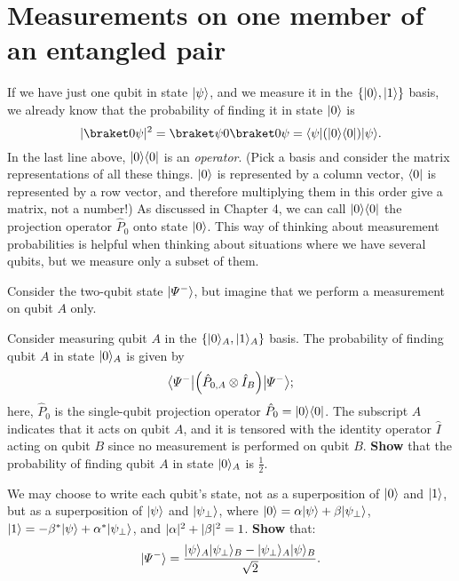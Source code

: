 \documentclass{../phys084}
\begin{document}
\begin{solution}
\end{solution}

\section{Measurements on one member of an entangled pair}

\begin{exercise}
  If we have just one qubit in state \(\lvert\psi\rangle\), and we measure it
  in the \(\{\lvert0\rangle, \lvert1\rangle\}\) basis, we already know that the
  probability of finding it in state \(\lvert0\rangle\) is
  \[
    \abs{\braket 0 \psi}^2
    = \braket \psi 0\braket 0 \psi
    = \bra \psi (\ket 0 \bra 0) \ket \psi.
  \]
  In the last line above, \(\lvert0\rangle \langle0\rvert\) is an \textit{operator}.
  (Pick a basis and consider the matrix representations of all these
  things.  \(\lvert0\rangle\) is represented by a column vector, \(\langle0\rvert\) is
  represented by a row vector, and therefore multiplying them in this
  order give a matrix, not a number!)  As discussed in Chapter 4, we
  can call \(\lvert0\rangle \langle0\rvert\) the projection operator \(\hat P_0\) onto
  state \(\lvert0\rangle\).  This way of thinking about measurement
  probabilities is helpful when thinking about situations where we
  have several qubits, but we measure only a subset of them.

  Consider the two-qubit state \(\lvert\Psi^-\rangle\), but imagine that we
  perform a measurement on qubit \(A\) only.

  \begin{problems}
  \item Consider measuring qubit \(A\) in the
    \(\{\lvert0\rangle_A, \lvert1\rangle_A\}\) basis.  The probability of finding
    qubit \(A\) in state \(\lvert0\rangle_A\) is given by
    \[
      \bra*{\Psi^-} \prn*{\hat P_{0,A} \otimes \hat I_B} \ket*{\Psi^-};
    \]
    here, \(\hat P_ 0\) is the single-qubit projection operator
    \(\hat P_ 0 = \lvert0\rangle \langle0\rvert\).  The subscript \(A\) indicates that
    it acts on qubit \(A\), and it is tensored with the identity
    operator \(\hat I\) acting on qubit \(B\) since no measurement is
    performed on qubit \(B\).  \textbf{Show} that the probability of
    finding qubit \(A\) in state \(\lvert0\rangle_A\) is \(\frac 1 2\).

  \item We may choose to write each qubit's state, not as a
    superposition of \(\lvert0\rangle\) and \(\lvert1\rangle\), but as a superposition
    of \(\lvert\psi\rangle\) and \(\lvert\psi_\perp\rangle\), where
    \(\lvert0\rangle = \alpha \lvert\psi\rangle + \beta \lvert\psi_\perp\rangle\),
    \(\lvert1\rangle = -\beta^* \lvert\psi\rangle + \alpha^* \lvert\psi_\perp\rangle\), and
    \(\lvert\alpha\rvert^2 + \lvert\beta\rvert^2 = 1\).  \textbf{Show} that:
    \[
      \lvert\Psi^-\rangle = \frac
      {\lvert\psi\rangle_A\lvert\psi_\perp\rangle_B - \lvert\psi_\perp\rangle_A\lvert\psi\rangle_B}
      {\sqrt 2}.
    \]


\end{problems}
\end{exercise}
\end{document}

